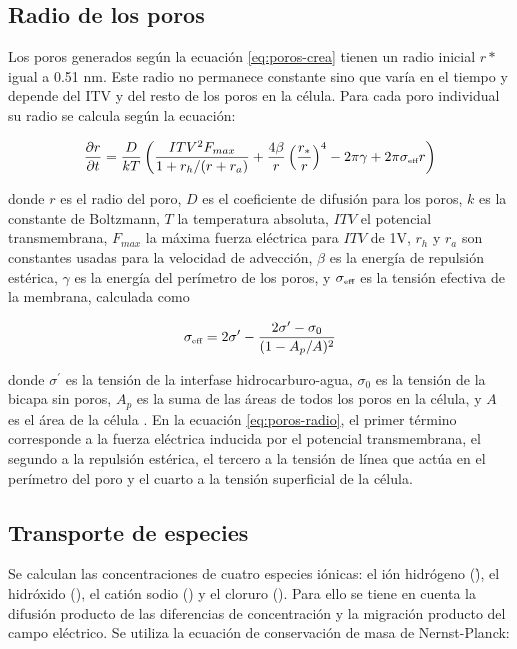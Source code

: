 \documentclass[a4paper,10pt]{article}
\begin{document}
\subsection{Radio de los poros}
Los poros generados según la ecuación \eqref{eq:poros-crea} tienen un radio inicial $r*$ igual a 0.51 \si{\nano\metre}. Este radio no permanece constante sino que varía en el tiempo y depende del ITV y del resto de los poros en la célula. Para cada poro individual su radio se calcula según la ecuación:

\begin{equation} \label{eq:poros-radio}
	\frac{\partial r}{\partial t} = \frac{D}{kT} \left( \frac{ITV^2 F_{max}}{1+r_h / (r+r_a)} + \frac{4 \beta}{r} \left(\frac{r_*}{r}\right)^4 - 2 \pi \gamma + 2 \pi \sigma_{\textrm{\tiny eff}} r\right)
\end{equation}

donde $r$ es el radio del poro, $D$ es el coeficiente de difusión para los poros, $k$ es la constante de Boltzmann, $T$ la temperatura absoluta, $ITV$ el potencial transmembrana, $F_{max}$ la máxima fuerza eléctrica para $ITV$ de 1V, $r_h$ y $r_a$ son constantes usadas para la velocidad de advección, $\beta$ es la energía de repulsión estérica, $\gamma$ es la energía del perímetro de los poros, y $\sigma_{\textrm{\tiny eff}}$ es la tensión efectiva de la membrana, calculada como

\begin{equation}
	\sigma_{\textrm{\tiny eff}} = 2 \sigma^\prime - \frac{2 \sigma^\prime - \sigma_0}{(1 - A_p / A)^2}
\end{equation}

donde $\sigma^\prime$ es la tensión de la interfase hidrocarburo-agua, $\sigma_0$ es la tensión de la bicapa sin poros, $A_p$ es la suma de las áreas de todos los poros en la célula, y $A$ es el área de la célula \cite{krass}. En la ecuación \ref{eq:poros-radio}, el primer término corresponde a la fuerza eléctrica inducida por el potencial transmembrana, el segundo a la repulsión estérica, el tercero a la tensión de línea que actúa en el perímetro del poro y el cuarto a la tensión superficial de la célula.\\

\subsection{Transporte de especies}
Se calculan las concentraciones de cuatro especies iónicas: el ión hidrógeno (\h), el hidróxido (\oh), el catión sodio (\na) y el cloruro (\cl). Para ello se tiene en cuenta la difusión producto de las diferencias de concentración y la migración producto del campo eléctrico. Se utiliza la ecuación de conservación de masa de Nernst-Planck:
\end{document}
